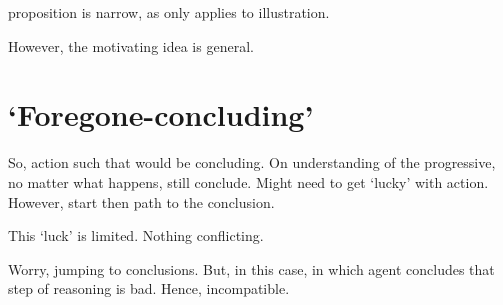 \begin{note}
  proposition is narrow, as only applies to illustration.

  However, the motivating idea is general.
\end{note}

\section{`Foregone-concluding'}
\label{sec:fc-progressive}

\begin{note}
  So, action such that would be concluding.
  On understanding of the progressive, no matter what happens, still conclude.
  Might need to get `lucky' with action.
  However, start then path to the conclusion.

  This `luck' is limited.
  Nothing conflicting.
\end{note}

\begin{note}
  Worry, jumping to conclusions.
  But, in this case, \pevent{} in which agent concludes that step of reasoning is bad.
  Hence, incompatible.
\end{note}

